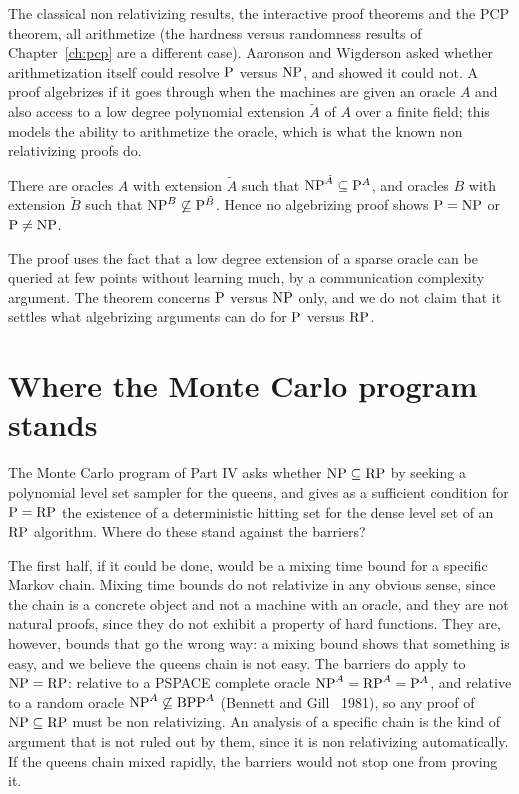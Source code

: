 The classical non relativizing results, the interactive proof theorems and the PCP theorem, all arithmetize (the hardness versus randomness results of Chapter~\ref{ch:pcp} are a different case). Aaronson and Wigderson asked whether arithmetization itself could resolve $\mathrm{P}$ versus $\mathrm{NP}$, and showed it could not. A proof algebrizes if it goes through when the machines are given an oracle $A$ and also access to a low degree polynomial extension $\tilde A$ of $A$ over a finite field; this models the ability to arithmetize the oracle, which is what the known non relativizing proofs do.

\begin{theorem}
There are oracles $A$ with extension $\tilde A$ such that $\mathrm{NP}^{\tilde A} \subseteq \mathrm{P}^{A}$, and oracles $B$ with extension $\tilde B$ such that $\mathrm{NP}^{B} \not\subseteq \mathrm{P}^{\tilde B}$. Hence no algebrizing proof shows $\mathrm{P} = \mathrm{NP}$ or $\mathrm{P} \neq \mathrm{NP}$.
\end{theorem}

The proof uses the fact that a low degree extension of a sparse oracle can be queried at few points without learning much, by a communication complexity argument. The theorem concerns $\mathrm{P}$ versus $\mathrm{NP}$ only, and we do not claim that it settles what algebrizing arguments can do for $\mathrm{P}$ versus $\mathrm{RP}$.

\section{Where the Monte Carlo program stands}

The Monte Carlo program of Part IV asks whether $\mathrm{NP} \subseteq \mathrm{RP}$ by seeking a polynomial level set sampler for the queens, and gives as a sufficient condition for $\mathrm{P} = \mathrm{RP}$ the existence of a deterministic hitting set for the dense level set of an $\mathrm{RP}$ algorithm. Where do these stand against the barriers?

The first half, if it could be done, would be a mixing time bound for a specific Markov chain. Mixing time bounds do not relativize in any obvious sense, since the chain is a concrete object and not a machine with an oracle, and they are not natural proofs, since they do not exhibit a property of hard functions. They are, however, bounds that go the wrong way: a mixing bound shows that something is easy, and we believe the queens chain is not easy. The barriers do apply to $\mathrm{NP} = \mathrm{RP}$: relative to a PSPACE complete oracle $\mathrm{NP}^A = \mathrm{RP}^A = \mathrm{P}^A$, and relative to a random oracle $\mathrm{NP}^A \not\subseteq \mathrm{BPP}^A$ (Bennett and Gill~\cite{BennettGill} 1981), so any proof of $\mathrm{NP} \subseteq \mathrm{RP}$ must be non relativizing. An analysis of a specific chain is the kind of argument that is not ruled out by them, since it is non relativizing automatically. If the queens chain mixed rapidly, the barriers would not stop one from proving it.

